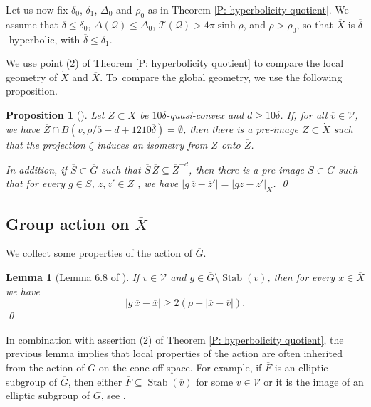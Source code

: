 \documentclass[JEP,XML,SOM,Unicode, NoEqCountersInSection,published]{cedram}
\let\mathcal\mathscr
\theoremstyle{plain}
\newtheorem{prop}[thm]{Proposition}
\newtheorem{lem}[thm]{Lemma}
\theoremstyle{definition}
\newcommand{\cX}{\dot{X}}
\newcommand{\qX}{\overline{X}}
\newcommand{\q}[1]{\overline{#1}}
\newcommand{\stab}[1]{\operatorname{Stab}(#1)}
\begin{document}
Let us now fix $\delta_0$, $\delta_1$, $\Delta_0$ and $\rho_0$ as in Theorem \ref{P: hyperbolicity quotient}. We assume that $\delta \leq \delta_0$, $\Delta(\mathcal Q) \leq \Delta_0$, $\mathcal T(\mathcal Q) > 4\pi \sinh\rho$, and $\rho > \rho_0$, so that $\q X$ is $\q \delta$-hyperbolic, with $\q \delta \leq \delta_1$.

We use point (2) of Theorem \ref{P: hyperbolicity quotient} to compare the local geometry of $\cX $ and $\q X$. To~compare the global geometry, we use the following proposition.

\begin{prop}[{\cite[Prop.\,3.21]{coulon_geometry_2014}}]\label{L: lifts of quasi-convex} Let $\q Z\!\subset\!\q X$ be $10 \bar\delta$-quasi-convex and \hbox{$d\!\geqslant\!10 \bar\delta$}.
If, for all $\q v \in \q {\mathcal V}$, we have $\q Z \cap B(\q v, \rho/5 +d+ 1210 \q \delta) =\emptyset$, then there is a pre-image $Z \subset \cX$ such that the projection $\zeta$ induces an isometry from $Z$ onto $\q Z$.

In addition, if $\q S\subset \q G$ such that $\q S \, \q Z \subseteq {\q Z}^{+d}$, then there is a pre-image $S\subset G$ such that for every $g \in S$, $z,z' \in Z$
, we have $|\q g\, \q z -\q z '| =|g z-z'|_{\cX}$.
\qed
\end{prop}

\subsection{Group action on \texorpdfstring{$\qX$}{X}}

We collect some properties of the action of $\q G$.

\begin{lem}[Lemma 6.8 of \cite{coulon_geometry_2014}]\label{L: rotation quotient space} If $v\in \mathcal V$ and $g\in \q G \setminus \stab{\q v}$, then for every $\q x\in \qX$ we have
\begin{equation*}
|\q g \,\q x -\q x|\geqslant 2(\rho - |\q x -\q v|).
\end{equation*} \qed
\end{lem}

In combination with assertion (2) of Theorem \ref{P: hyperbolicity quotient}, the previous lemma implies that local properties of the action are often inherited from the action of $G$ on the cone-off space. For example, if $\q F$ is an elliptic subgroup of $\q G$, then either $\q F \subseteq \stab{\q v}$ for some $v\in \mathcal V$ or it is the image of an elliptic subgroup of $G$, see \cite[Prop.\,6.12]{coulon_geometry_2014}.
\end{document}
